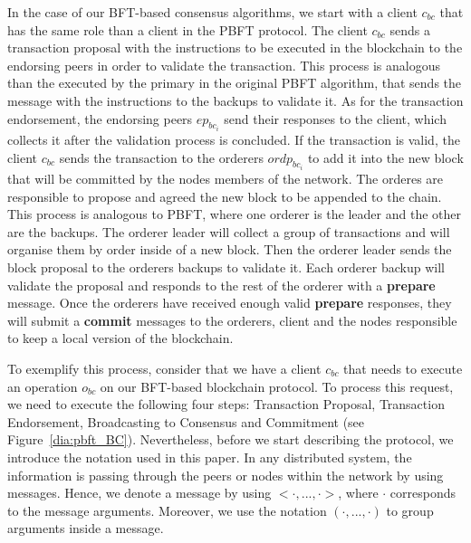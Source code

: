 \documentclass[conference]{llncs}
\begin{document}
In the case of our BFT-based consensus algorithms, we start with a client $c_{bc}$ that has the same role than a client in the PBFT protocol. The client $c_{bc}$ sends a transaction proposal with the instructions to be executed in the blockchain to the endorsing peers in order to validate the transaction. This process is analogous than the executed by the primary in the original PBFT algorithm, that sends the message with the instructions to the backups to validate it. As for the transaction endorsement, the endorsing peers $ep_{bc_{i}}$ send their responses to the client, which collects it after the validation process is concluded. If the transaction is valid, the client $c_{bc}$ sends the transaction to the orderers $ordp_{bc_{i}}$ to add it into the new block that will be committed by the nodes members of the network. The orderes are responsible to propose and agreed the new block to be appended to the chain. This process is analogous to PBFT, where one orderer is the leader and the other are the backups. The orderer leader will collect a group of transactions and will organise them by order inside of a new block. Then the orderer leader sends the block proposal to the orderers backups to validate it. Each orderer backup will validate the proposal and responds to the rest of the orderer with a \textbf{prepare} message. Once the orderers have received enough valid \textbf{prepare} responses, they will submit a \textbf{commit} messages to the orderers, client and the nodes responsible to keep a local version of the blockchain.

To exemplify this process, consider that we have a client $c_{bc}$ that needs to execute an operation $o_{bc}$ on our BFT-based blockchain protocol. To process this request, we need to execute the following four steps: Transaction Proposal, Transaction Endorsement, Broadcasting to Consensus and Commitment (see Figure~\ref{dia:pbft_BC}). Nevertheless,  before we start describing the protocol, we introduce the notation used in this paper. In any distributed system, the information is passing through the peers or nodes within the network by using messages. Hence, we  denote a message by using $<\cdot,...,\cdot>$, where $\cdot$ corresponds to the message arguments. Moreover, we use the notation $(\cdot,...,\cdot)$ to group arguments inside a message.
\end{document}
